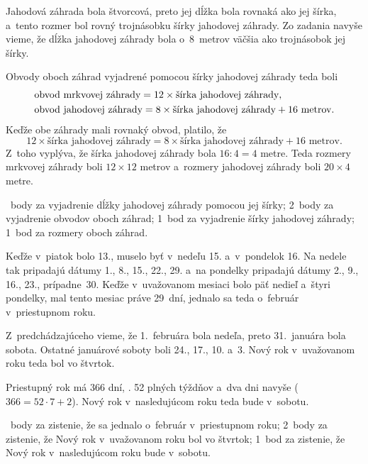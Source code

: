 {%
Jahodová záhrada bola štvorcová, preto jej dĺžka bola rovnaká ako jej
šírka, a~tento rozmer bol rovný trojnásobku šírky jahodovej záhrady. Zo
zadania navyše vieme, že dĺžka jahodovej záhrady bola o~8~metrov väčšia ako
trojnásobok jej šírky.
%

Obvody oboch záhrad vyjadrené pomocou šírky jahodovej záhrady teda boli
$$
\aligned
&\text{obvod mrkvovej záhrady} = 12 \times \text{šírka jahodovej záhrady}, \\
&\text{obvod jahodovej záhrady} = 8 \times \text{šírka jahodovej záhrady} + \text{16 metrov}. \\
\endaligned
$$
Keďže obe záhrady mali rovnaký obvod, platilo, že
$$
12 \times \text{šírka jahodovej záhrady}
= 8 \times \text{šírka jahodovej záhrady} + \text{16 metrov}.
$$
Z~toho vyplýva, že šírka jahodovej záhrady bola $16:4=4$ metre.
Teda rozmery mrkvovej záhrady boli $12\times 12$ metrov a~rozmery jahodovej
záhrady boli $20\times 4$ metre.

~body za vyjadrenie dĺžky jahodovej záhrady pomocou jej šírky;
2~body za vyjadrenie obvodov oboch záhrad;
1~bod za vyjadrenie šírky jahodovej záhrady;
1~bod za rozmery oboch záhrad.
\endhodnotenie
}

{%
Keďže v~piatok bolo 13., muselo byť v~nedeľu 15. a~v~pondelok 16.
Na nedele tak pripadajú dátumy 1., 8., 15., 22., 29. a~na pondelky
pripadajú dátumy 2., 9., 16., 23., prípadne~30.
Keďže v~uvažovanom mesiaci bolo päť nedieľ a~štyri pondelky, mal tento
mesiac práve 29~dní, jednalo sa teda o~február v~priestupnom roku.

Z~predchádzajúceho vieme, že 1.~februára bola nedeľa, preto 31.~januára bola sobota.
Ostatné januárové soboty boli 24., 17., 10. a~3.
Nový rok v~uvažovanom roku teda bol vo štvrtok.

Priestupný rok má 366 dní, \tj. 52 plných týždňov a~dva dni navyše
($366={52\cdot 7+2}$).
Nový rok v~nasledujúcom roku teda bude v~sobotu.

~body za zistenie, že sa jednalo o~február v~priestupnom roku;
2~body za zistenie, že Nový rok v~uvažovanom roku bol vo štvrtok;
1~bod za zistenie, že Nový rok v~nasledujúcom roku bude v~sobotu.
\endhodnotenie
}


